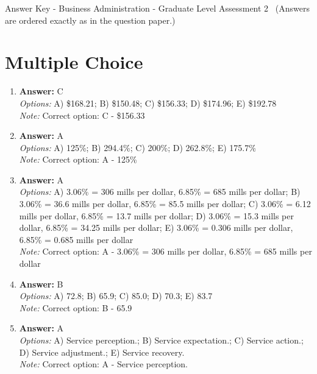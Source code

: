 \documentclass[12pt]{article}
\begin{document}
\begin{center}
Answer Key - Business Administration - Graduate Level Assessment 2 \
\small (Answers are ordered exactly as in the question paper.)
\end{center}

\section*{Multiple Choice}
\begin{enumerate}[label=\arabic*.]
\item \textbf{Answer:} C
\\ \textit{Options:} A) \$168.21; B) \$150.48; C) \$156.33; D) \$174.96; E) \$192.78
\\ \textit{Note:} Correct option: C - \$156.33
\item \textbf{Answer:} A
\\ \textit{Options:} A) 125\%; B) 294.4\%; C) 200\%; D) 262.8\%; E) 175.7\%
\\ \textit{Note:} Correct option: A - 125\%
\item \textbf{Answer:} A
\\ \textit{Options:} A) 3.06\% = 306 mills per dollar, 6.85\% = 685 mills per dollar; B) 3.06\% = 36.6 mills per dollar, 6.85\% = 85.5 mills per dollar; C) 3.06\% = 6.12 mills per dollar, 6.85\% = 13.7 mills per dollar; D) 3.06\% = 15.3 mills per dollar, 6.85\% = 34.25 mills per dollar; E) 3.06\% = 0.306 mills per dollar, 6.85\% = 0.685 mills per dollar
\\ \textit{Note:} Correct option: A - 3.06\% = 306 mills per dollar, 6.85\% = 685 mills per dollar
\item \textbf{Answer:} B
\\ \textit{Options:} A) 72.8; B) 65.9; C) 85.0; D) 70.3; E) 83.7
\\ \textit{Note:} Correct option: B - 65.9
\item \textbf{Answer:} A
\\ \textit{Options:} A) Service perception.; B) Service expectation.; C) Service action.; D) Service adjustment.; E) Service recovery.
\\ \textit{Note:} Correct option: A - Service perception.
\end{enumerate}
\end{document}

